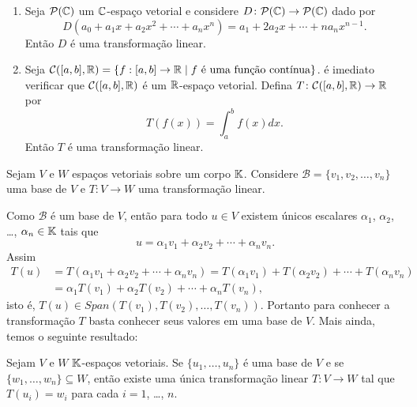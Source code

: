 \begin{exemplo}
\begin{enumerate}[label={\arabic*})]
        \item Seja $\mathcal{P}(\mathbb{C})$ um $\mathbb{C}$-espaço vetorial e considere $D \colon \mathcal{P}(\mathbb{C}) \to \mathcal{P}(\mathbb{C})$ dado por
        \[
            D(a_0 + a_1x + a_2x^2 + \cdots + a_nx^n) = a_1 + 2a_2x + \cdots + na_nx^{n-1}.
        \]
        Então $D$ é uma transformação linear.

        \item Seja $\mathcal{C}([a,b], \mathbb{R}) = \{ f : [a,b] \to \mathbb{R} \mid f \mbox{ é uma função contínua}\}$. é imediato verificar que $\mathcal{C}([a,b], \mathbb{R})$ é um $\mathbb{R}$-espaço vetorial. Defina $T \colon \mathcal{C}([a,b], \mathbb{R}) \to \mathbb{R}$ por
        \[
            T(f(x)) = \int_a^bf(x)dx.
        \]
        Então $T$ é uma transformação linear.
    \end{enumerate}
\end{exemplo}

Sejam $V$ e $W$ espaços vetoriais sobre um corpo $\mathbb{K}$. Considere $\mathcal{B} = \{v_1, v_2, \dots, v_n\}$ uma base de $V$ e $T \colon V \to W$ uma transformação linear.

Como $\mathcal{B}$ é um base de $V$, então para todo $u \in V$ existem únicos escalares $\alpha_1$, $\alpha_2$, \dots, $\alpha_n \in \mathbb{K}$ tais que
\[
    u = \alpha_1v_1 + \alpha_2v_2 + \cdots + \alpha_nv_n.
\]
Assim
\begin{align*}
    T(u) &= T(\alpha_1v_1 + \alpha_2v_2 + \cdots + \alpha_nv_n) = T(\alpha_1v_1) + T(\alpha_2v_2) + \cdots + T(\alpha_nv_n) \\ &= \alpha_1T(v_1) + \alpha_2T(v_2) + \cdots + \alpha_nT(v_n),
\end{align*}
isto é, $T(u) \in Span(T(v_1), T(v_2), \dots, T(v_n))$. Portanto para conhecer a transformação $T$ basta conhecer seus valores em uma base de $V$. Mais ainda, temos o seguinte resultado:

\begin{teorema}\label{existencia_de_transformacao_unica_dado_valores}
    Sejam $V$ e $W$ $\mathbb{K}$-espaços vetoriais. Se $\{u_1, \dots, u_n\}$ é uma base de $V$ e se $\{w_1, \dots, w_n\} \subseteq W$, então existe uma única transformação linear $T \colon V \to W$ tal que $T(u_i) = w_i$ para cada $i = 1$, \dots, $n$.
\end{teorema}

